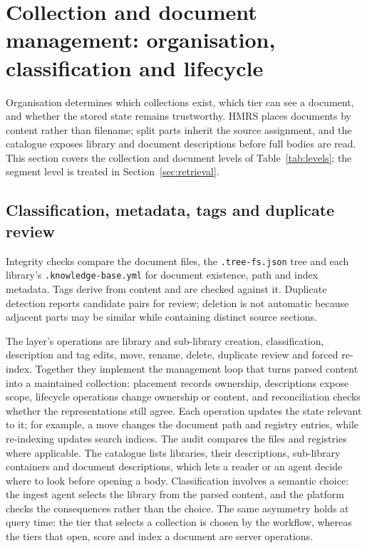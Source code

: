\section{Collection and document management: organisation, classification and
lifecycle}
\label{sec:organization}

Organisation determines which collections exist, which tier can see a
document, and whether the stored state remains trustworthy. HMRS places
documents by content rather than filename; split parts inherit the source
assignment, and the catalogue exposes library and document descriptions
before full bodies are read. This section covers the collection and document
levels of Table~\ref{tab:levels}; the segment level is treated in
Section~\ref{sec:retrieval}.

\subsection{Classification, metadata, tags and duplicate review}
\label{sec:org-placement}
\label{sec:org-registries}
\label{sec:org-tags}
\label{sec:org-dedup}

Integrity checks compare the document files, the \texttt{.tree-fs.json} tree
and each library's \texttt{.knowledge-base.yml} for document existence, path
and index metadata. Tags derive from content and are checked against it.
Duplicate detection reports candidate pairs for review; deletion is not
automatic because adjacent parts may be similar while containing distinct
source sections.

The layer's operations are library and sub-library creation, classification,
description and tag edits, move, rename, delete, duplicate review and forced
re-index. Together they implement the management loop that turns parsed content
into a maintained collection: placement records ownership, descriptions expose
scope, lifecycle operations change ownership or content, and reconciliation
checks whether the representations still agree. Each operation updates the
state relevant to it; for example, a move changes the document path and
registry entries, while re-indexing updates search indices. The audit compares
the files and registries where applicable. The catalogue lists libraries, their
descriptions, sub-library containers and document descriptions, which lets a
reader or an agent decide where to look before opening a body. Classification
involves a semantic choice: the ingest agent
selects the library from the parsed content, and the platform checks the
consequences rather than the choice. The same asymmetry holds at query time:
the tier that selects a collection is chosen by the workflow, whereas the tiers
that open, score and index a document are server operations.

